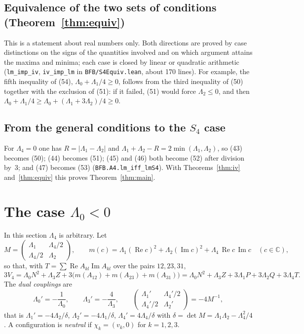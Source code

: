 \documentclass[11pt,a4paper]{amsart}
\theoremstyle{remark}
\newcommand{\C}{\mathbb{C}}
\newcommand{\La}{\Lambda}
\newcommand{\lean}[1]{\texttt{#1}}
\renewcommand{\Re}{\operatorname{Re}}
\renewcommand{\Im}{\operatorname{Im}}
\begin{document}
\subsection{Equivalence of the two sets of conditions (Theorem~\ref{thm:equiv})}
This is a statement about real numbers only. Both directions are proved by case distinctions on the signs of
the quantities involved and on which argument attains the maxima and minima; each case is closed by linear or
quadratic arithmetic (\lean{lm\_imp\_iv}, \lean{iv\_imp\_lm} in \lean{BFB/S4Equiv.lean}, about 170 lines). For
example, the fifth inequality of (54), $\La_0+\La_1/4\ge0$, follows from the third inequality of (50) together
with the exclusion of (51): if it failed, (51) would force $\La_2\le0$, and then
$\La_0+\La_1/4\ge\La_0+(\La_1+3\La_2)/4\ge0$.

\subsection{From the general conditions to the $S_4$ case}
For $\La_4=0$ one has $R=|\La_1-\La_2|$ and $\La_1+\La_2-R=2\min(\La_1,\La_2)$, so (43) becomes (50); (44)
becomes (51); (45) and (46) both become (52) after division by~3; and (47) becomes (53)
(\lean{BFB.A4.lm\_iff\_lmS4}). With Theorems~\ref{thm:iv} and~\ref{thm:equiv} this proves
Theorem~\ref{thm:main}.


\section{The case $\Lambda_0<0$}\label{sec:neg}

In this section $\La_4$ is arbitrary. Let
\[
M=\begin{pmatrix}\La_1&\La_4/2\\ \La_4/2&\La_2\end{pmatrix},\qquad
m(c)=\La_1(\Re c)^2+\La_2(\Im c)^2+\La_4\,\Re c\,\Im c\quad(c\in\C),
\]
so that, with $T=\sum\Re A_{kl}\Im A_{kl}$ over the pairs $12,23,31$,
\begin{equation}\label{V4m}
3V_4=\La_0N^2+\La_3Z+3\bigl(m(A_{12})+m(A_{23})+m(A_{31})\bigr)=\La_0N^2+\La_3Z+3\La_1P+3\La_2Q+3\La_4T .
\end{equation}
The \emph{dual couplings} are
\[
\La_0'=-\frac1{\La_0},\qquad \La_3'=-\frac4{\La_3},\qquad
\begin{pmatrix}\La_1'&\La_4'/2\\ \La_4'/2&\La_2'\end{pmatrix}=-4M^{-1},
\]
that is $\La_1'=-4\La_2/\delta$, $\La_2'=-4\La_1/\delta$, $\La_4'=4\La_4/\delta$ with
$\delta=\det M=\La_1\La_2-\La_4^2/4$. A configuration is \emph{neutral} if $\chi_k=(v_k,0)$ for $k=1,2,3$.
\end{document}
